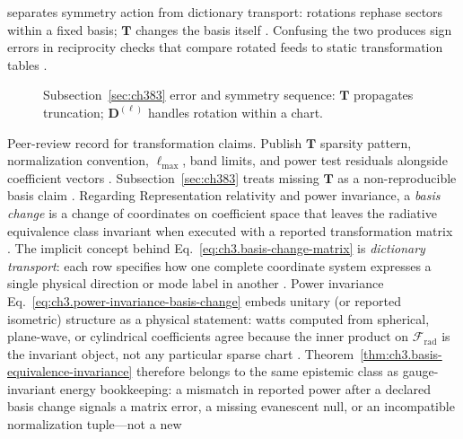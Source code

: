 separates symmetry action from dictionary transport: rotations rephase sectors within a fixed basis; \(\mathbf{T}\) changes the basis itself
\cite{harrington2001}. Confusing the two produces sign errors in reciprocity checks that compare rotated feeds to static transformation tables
\cite{stratton1941}.
\begin{figure}[t]
\centering
{}
\caption{Subsection~\ref{sec:ch383} error and symmetry sequence: \(\mathbf{T}\) propagates truncation; \(\mathbf{D}^{(\ell)}\) handles rotation within a chart.}
\label{fig:ch3.383-error-rotation}
\end{figure}
Peer-review record for transformation claims. Publish \(\mathbf{T}\) sparsity pattern, normalization convention, \(\ell_{\max}\), band limits, and power test residuals alongside
coefficient vectors \cite{harrington2001}. Subsection~\ref{sec:ch383} treats missing \(\mathbf{T}\) as a non-reproducible
basis claim \cite{harrington2001}.
Regarding Representation relativity and power invariance, a \emph{basis change} is a change of coordinates on coefficient space that leaves the radiative equivalence class
invariant when executed with a reported transformation matrix \cite{hansen1988}. The
implicit concept behind Eq.~\eqref{eq:ch3.basis-change-matrix} is \emph{dictionary transport}: each row specifies how
one complete coordinate system expresses a single physical direction or mode label in another \cite{jackson1999}.
Power invariance Eq.~\eqref{eq:ch3.power-invariance-basis-change} embeds unitary (or reported isometric) structure as
a physical statement: watts computed from spherical, plane-wave, or cylindrical coefficients agree because the inner
product on \(\mathcal{F}_{\mathrm{rad}}\) is the invariant object, not any particular sparse chart
\cite{poynting1884}. Theorem~\ref{thm:ch3.basis-equivalence-invariance} therefore belongs
to the same epistemic class as gauge-invariant energy bookkeeping: a mismatch in reported power after a declared
basis change signals a matrix error, a missing evanescent null, or an incompatible normalization tuple---not a new
